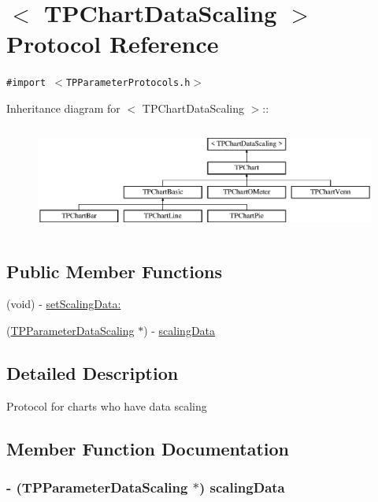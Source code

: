 \hypertarget{protocol_t_p_chart_data_scaling-p}{
\section{$<$ TPChartDataScaling $>$ Protocol Reference}
\label{protocol_t_p_chart_data_scaling-p}
}
{\tt \#import $<$TPParameterProtocols.h$>$}

Inheritance diagram for $<$ TPChartDataScaling $>$::\begin{figure}[H]
\begin{center}
\leavevmode
\includegraphics[height=3.5443cm]{protocol_t_p_chart_data_scaling-p}
\end{center}
\end{figure}
\subsection*{Public Member Functions}
\begin{CompactItemize}
\item 
(void) - \hyperlink{protocol_t_p_chart_data_scaling-p_940844c4e44e6f253f1b9b389646793d}{setScalingData:}
\item 
(\hyperlink{interface_t_p_parameter_data_scaling}{TPParameterDataScaling} $\ast$) - \hyperlink{protocol_t_p_chart_data_scaling-p_07baf58661290fbb5218acf690c7f444}{scalingData}
\end{CompactItemize}


\subsection{Detailed Description}
Protocol for charts who have data scaling 

\subsection{Member Function Documentation}
\hypertarget{protocol_t_p_chart_data_scaling-p_07baf58661290fbb5218acf690c7f444}{
\subsubsection[{scalingData}]{\setlength{\rightskip}{0pt plus 5cm}- ({\bf TPParameterDataScaling} $\ast$) scalingData }}
\label{protocol_t_p_chart_data_scaling-p_07baf58661290fbb5218acf690c7f444}


